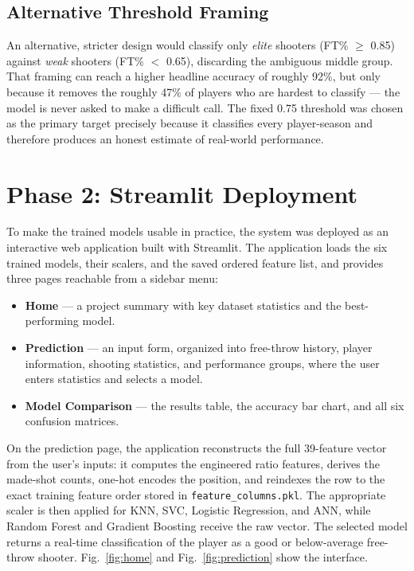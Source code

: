 \documentclass[conference]{IEEEtran}
\begin{document}
\subsection{Alternative Threshold Framing}

An alternative, stricter design would classify only \textit{elite} shooters (FT\% $\geq$ 0.85) against \textit{weak} shooters (FT\% $<$ 0.65), discarding the ambiguous middle group. That framing can reach a higher headline accuracy of roughly 92\%, but only because it removes the roughly 47\% of players who are hardest to classify --- the model is never asked to make a difficult call. The fixed 0.75 threshold was chosen as the primary target precisely because it classifies every player-season and therefore produces an honest estimate of real-world performance.


\section{Phase 2: Streamlit Deployment}

To make the trained models usable in practice, the system was deployed as an interactive web application built with Streamlit. The application loads the six trained models, their scalers, and the saved ordered feature list, and provides three pages reachable from a sidebar menu:

\begin{itemize}
\item \textbf{Home} --- a project summary with key dataset statistics and the best-performing model.
\item \textbf{Prediction} --- an input form, organized into free-throw history, player information, shooting statistics, and performance groups, where the user enters statistics and selects a model.
\item \textbf{Model Comparison} --- the results table, the accuracy bar chart, and all six confusion matrices.
\end{itemize}

On the prediction page, the application reconstructs the full 39-feature vector from the user's inputs: it computes the engineered ratio features, derives the made-shot counts, one-hot encodes the position, and reindexes the row to the exact training feature order stored in \texttt{feature\_columns.pkl}. The appropriate scaler is then applied for KNN, SVC, Logistic Regression, and ANN, while Random Forest and Gradient Boosting receive the raw vector. The selected model returns a real-time classification of the player as a good or below-average free-throw shooter. Fig.~\ref{fig:home} and Fig.~\ref{fig:prediction} show the interface.
\end{document}
